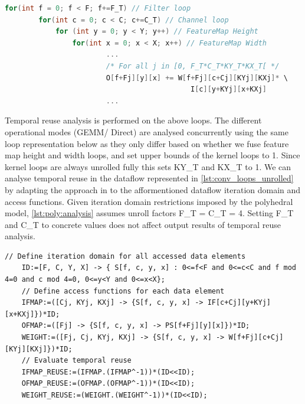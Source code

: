 \begin{lstlisting}[language=C, caption=Fully unrolled convolution dataflow loops, label={lst:conv_loops_unrolled}]
    for(int f = 0; f < F; f+=F_T) // Filter loop
        for(int c = 0; c < C; c+=C_T) // Channel loop
            for (int y = 0; y < Y; y++) // FeatureMap Height
                for(int x = 0; x < X; x++) // FeatureMap Width
                        ...
                        /* For all j in [0, F_T*C_T*KY_T*KX_T[ */ 
                        O[f+Fj][y][x] += W[f+Fj][c+Cj][KYj][KXj]* \
                                            I[c][y+KYj][x+KXj] 
                        ...
\end{lstlisting}

Temporal reuse analysis is performed on the above loops. The different
operational modes (GEMM/ Direct) are analysed concurrently using the same loop
representation below as they only differ based on whether we fuse feature map
height and width loops, and set upper bounds of the kernel loops to 1. Since
kernel loops are always unrolled fully this sets KY\_T and KX\_T to 1. We can
analyse temporal reuse in the dataflow represented in
\autoref{lst:conv_loops_unrolled} by adapting the approach in \cite{meeus} 
to the afformentioned dataflow iteration domain and access functions.
Given iteration domain restrictions imposed by the polyhedral model,
\autoref{lst:poly:analysis} assumes unroll factors F\_T =
C\_T = 4. Setting F\_T and C\_T to concrete values does not affect output
results of temporal reuse analysis.

\clearpage
\begin{lstlisting}[caption=Polyhedral analysis of reuse in iscc for convolution loops, label={lst:poly:analysis}]
    // Define iteration domain for all accessed data elements
    ID:=[F, C, Y, X] -> { S[f, c, y, x] : 0<=f<F and 0<=c<C and f mod 4=0 and c mod 4=0, 0<=y<Y and 0<=x<X};
    // Define access functions for each data element
    IFMAP:=([Cj, KYj, KXj] -> {S[f, c, y, x] -> IF[c+Cj][y+KYj][x+KXj]})*ID;
    OFMAP:=([Fj] -> {S[f, c, y, x] -> PS[f+Fj][y][x]})*ID;
    WEIGHT:=([Fj, Cj, KYj, KXj] -> {S[f, c, y, x] -> W[f+Fj][c+Cj][KYj][KXj]})*ID;
    // Evaluate temporal reuse
    IFMAP_REUSE:=(IFMAP.(IFMAP^-1))*(ID<<ID);
    OFMAP_REUSE:=(OFMAP.(OFMAP^-1))*(ID<<ID);
    WEIGHT_REUSE:=(WEIGHT.(WEIGHT^-1))*(ID<<ID);  

\end{lstlisting}

